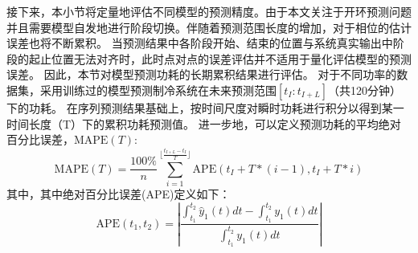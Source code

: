 接下来，本小节将定量地评估不同模型的预测精度。由于本文关注于开环预测问题并且需要模型自发地进行阶段切换。伴随着预测范围长度的增加，对于相位的估计误差也将不断累积。
当预测结果中各阶段开始、结束的位置与系统真实输出中阶段的起止位置无法对齐时，此时点对点的误差评估并不适用于量化评估模型的预测误差。
因此，本节对模型预测功耗的长期累积结果进行评估。
对于不同功率的数据集，采用训练过的模型预测制冷系统在未来预测范围$[{t_I:t_{I+L}}]$（共120分钟）下的功耗。
在序列预测结果基础上，按时间尺度对瞬时功耗进行积分以得到某一时间长度（T）下的累积功耗预测值。
进一步地，可以定义预测功耗的平均绝对百分比误差，$\text{MAPE}(T)$:
\vspace{-5pt}
\begin{equation}
\text{MAPE}(T) = \frac{100\%}{n}\sum\limits_{i=1}^{\lfloor\frac{t_{I+L}-t_I}{T}\rfloor}\text{APE}(t_I+T*(i-1),t_I+T*i)
\label{equ:energy_mape}
\end{equation}
其中，其中绝对百分比误差(APE)定义如下：
\begin{equation}
\text{APE}(t_1,t_2) = \left|\frac{\int_{t_1}^{t_2}\hat{y}_1(t)dt-\int_{t_1}^{t_2}y_1(t)dt}{\int_{t_1}^{t_2}y_1(t)dt}\right|
\end{equation}
